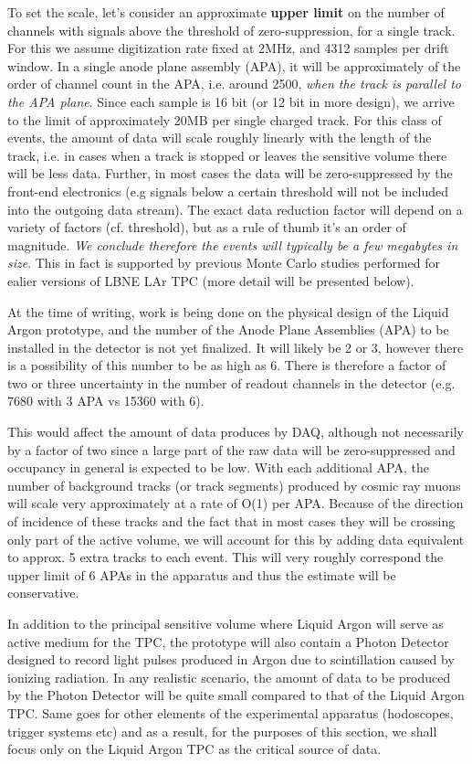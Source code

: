 To set the scale, let's consider an approximate \textbf{upper limit} on the number of channels with signals above the threshold
of zero-suppression, for a single track. For this we assume digitization rate fixed at 2MHz, and 4312 samples per drift window. In a single
anode plane assembly (APA), it will be approximately of the order of channel count in the APA, i.e. around 2500, \textit{when the track is parallel to the APA plane}.
Since each sample is 16 bit (or 12 bit in more design), we arrive to the limit of approximately 20MB per single charged track.
For this class of events, the amount of data will scale roughly linearly with the length of the track, i.e. in cases when a track is stopped or leaves the sensitive volume
there will be less data. Further, in most cases the data will be zero-suppressed by the front-end electronics (e.g signals below a certain threshold
will not be included into the outgoing data stream). The exact data reduction factor will depend on a variety of factors (cf. threshold), but as a rule of
thumb it's an order of magnitude. \textit{We conclude therefore the events will typically be a few megabytes in size}. This in fact is supported
by previous Monte Carlo studies performed for ealier versions of LBNE LAr TPC (more detail will be presented below).

At the time of writing, work is being done on the physical design of the Liquid Argon prototype, and the number of the Anode Plane Assemblies (APA)
to be installed in the detector is not yet finalized. It will likely be 2 or 3, however there is a possibility of this number to be as high as 6.  There is therefore a
factor of two or three  uncertainty in the number of readout channels in the detector (e.g. 7680 with 3 APA vs 15360 with 6).

This would affect the amount of data produces by DAQ, although not necessarily by a factor of two since a large part of the raw data will be zero-suppressed
and occupancy in general is expected to be low. With each additional APA, the number of background tracks (or track segments) produced by cosmic ray
muons will scale very approximately at a rate of O(1) per APA. Because of the direction of incidence of these tracks and the fact that in most cases they will
be crossing only part of the active volume, we will account for this by adding data equivalent to approx. 5 extra tracks to each event. This will very roughly correspond
the upper limit of 6 APAs in the apparatus and thus the estimate will be conservative.

In addition to the principal sensitive volume where Liquid Argon will serve as active medium for the TPC, the prototype will also contain a Photon Detector designed
to record light pulses produced in Argon due to scintillation caused by ionizing radiation. In any realistic scenario, the amount of data to be produced by
the Photon Detector will be quite small compared to that of the Liquid Argon TPC. Same goes for other elements of the experimental apparatus (hodoscopes,
trigger systems etc) and as a result, for the purposes of this section, we shall focus only on the Liquid Argon TPC as the critical source of data.


